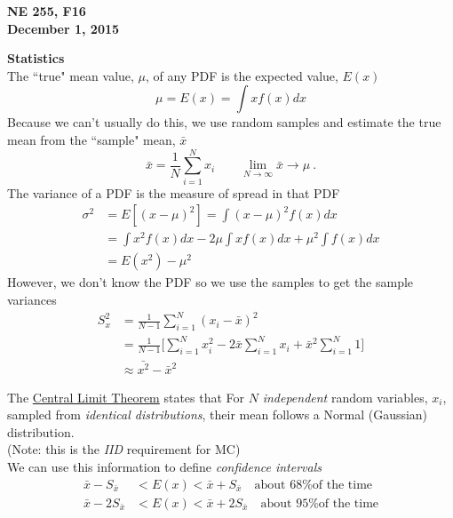 \documentclass[12pt]{article}
\begin{document}
\begin{center}
{\bf NE 255, F16\\
December 1, 2015 
}
\end{center}


\textbf{Statistics}\\
The ``true" mean value, $\mu$, of any PDF is the expected value, $E(x)$
\[
\mu = E(x) = \int x f(x) dx
\]
Because we can't usually do this, we use random samples and estimate the true mean from the ``sample" mean, $\bar{x}$
\[
\bar{x} = \frac{1}{N}\sum_{i=1}^N x_i \qquad \lim_{N \to \infty} \bar{x} \rightarrow \mu\:.
\]
The variance of a PDF is the measure of spread in that PDF
\begin{align*}
\sigma^2 &= E[(x - \mu)^2] = \int (x - \mu)^2 f(x) dx \\
&= \int x^2 f(x) dx - 2 \mu \int x f(x) dx + \mu^2 \int f(x) dx\\
&= E(x^2) - \mu^2
\end{align*}
%
However, we don't know the PDF so we use the samples to get the sample variances
\begin{align*}
S_x^2 &= \frac{1}{N-1}\sum_{i=1}^N (x_i - \bar{x})^2 \\
&= \frac{1}{N-1} \biggl[\sum_{i=1}^N x_i^2 - 2 \bar{x}\sum_{i=1}^N x_i + \bar{x}^2 \sum_{i=1}^N 1 \biggr] \\
&\approx \bar{x^2} - \bar{x}^2
\end{align*}

The \underline{Central Limit Theorem} states that
For $N$ \textit{independent} random variables, $x_i$, sampled from \textit{identical distributions}, their mean follows a Normal (Gaussian) distribution.\\
(Note: this is the \textit{IID} requirement for MC)\\
We can use this information to define \textit{confidence intervals}
\begin{align*}
\bar{x} - S_{\bar{x}} &< E(x) < \bar{x} + S_{\bar{x}} \quad \text{about 68\% of the time}\\
\bar{x} - 2S_{\bar{x}} &< E(x) < \bar{x} + 2S_{\bar{x}} \quad \text{about 95\% of the time}
\end{align*}
\end{document}
